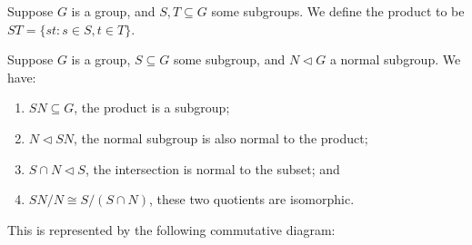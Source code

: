 \begin{definition}
    Suppose \(G\) is a group,
    and \(S,T \subseteq G\) some subgroups.
    We define the product to be \(ST = \{st : s \in S, t \in T\}\).
\end{definition}

\begin{theorem}\label{thm:iso-2-group}
    Suppose \(G\) is a group,
    \(S \subseteq G\) some subgroup,
    and \(N \lhd G\) a normal subgroup.
    We have:
    \begin{enumerate}[label={(\alph*)}, itemsep=0mm]
        \item \(SN \subseteq G\), the product is a subgroup;
        \item \(N \lhd SN\),
            the normal subgroup is also normal to the product;
        \item \(S \cap N \lhd S\),
            the intersection is normal to the subset; and
        \item \(SN/N \cong S/(S \cap N)\),
            these two quotients are isomorphic.
    \end{enumerate}
    
    This is represented by the following commutative diagram:
    \begin{center}
    \end{center}
\end{theorem}
